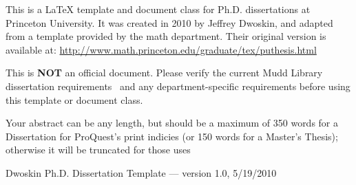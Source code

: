 This is a \LaTeX{} template and document class for Ph.D. dissertations at Princeton University. It was created in 2010 by Jeffrey Dwoskin, and adapted from a template provided by the math department. Their original version is available at: \url{http://www.math.princeton.edu/graduate/tex/puthesis.html}

This is \textbf{NOT} an official document. Please verify the current Mudd Library dissertation requirements~ and any department-specific requirements before using this template or document class.


Your abstract can be any length, but should be a maximum of 350 words for a Dissertation for ProQuest's print indicies (or 150 words for a Master's Thesis); otherwise it will be truncated for those uses~


Dwoskin Ph.D. Dissertation Template --- version 1.0, 5/19/2010

